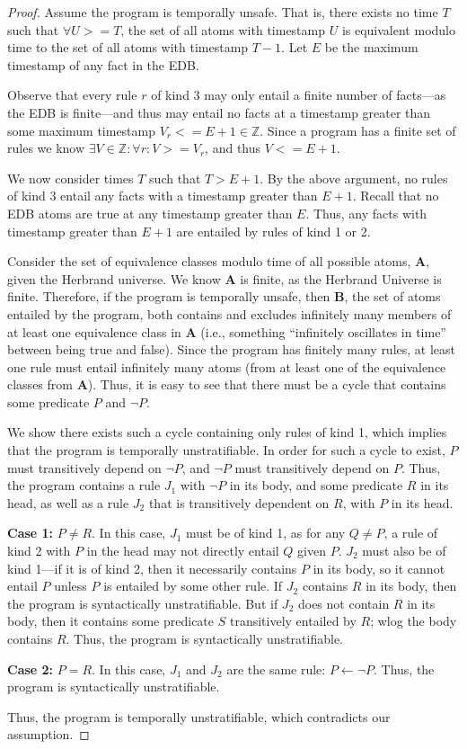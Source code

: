 \begin{proof}
%
Assume the program is temporally unsafe.  That is, there exists no time $T$
such that $\forall U >= T$, the set of all atoms with timestamp $U$ is
equivalent modulo time to the set of all atoms with timestamp $T-1$.  Let $E$
be the maximum timestamp of any fact in the EDB.

Observe that every rule $r$ of kind 3 may only entail a finite number
of facts---as the EDB is finite---and thus may entail no facts at a
timestamp greater than some maximum timestamp $V_r <= E+1 \in
\mathbb{Z}$.  Since a \slang program has a finite set of rules we know
$\exists V \in \mathbb{Z} : \forall r: V >= V_r$, and thus $V <= E+1$.

We now consider times $T$ such that $T > E+1$.  By the above argument, no rules
of kind 3 entail any facts with a timestamp greater than $E+1$.  Recall that
no EDB atoms are true at any timestamp greater than $E$.  Thus, any facts with
timestamp greater than $E+1$ are entailed by rules of kind 1 or 2.

Consider the set of equivalence classes modulo time of all possible atoms, {\bf
A}, given the Herbrand universe.  We know {\bf A} is finite, as the Herbrand
Universe is finite.  Therefore, if the program is temporally unsafe, then {\bf B}, the
set of atoms entailed by the program, both contains and excludes
infinitely many members of at least one equivalence class in {\bf A} (i.e.,
something ``infinitely oscillates in time'' between being true and false).
Since the program has finitely many rules, at least one rule must entail
infinitely many atoms (from at least one of the equivalence classes from {\bf
A}). Thus, it is easy to see that there must be a cycle that contains some predicate $P$ and $\lnot P$.

We show there exists such a cycle containing only rules of kind 1, which
implies that the program is temporally unstratifiable.  In order for such a
cycle to exist, $P$ must transitively depend on $\lnot P$, and $\lnot P$ must
transitively depend on $P$.  Thus, the program contains a rule $J_1$ with
$\lnot P$ in its body, and some predicate $R$ in its head, as well as a rule
$J_2$ that is transitively dependent on $R$, with $P$ in its head.

{\bf Case 1: }$P \neq R$.  In this case, $J_1$ must be of kind 1, as for any $Q
\neq P$, a rule of kind 2 with $P$ in the head may not directly entail $Q$
given $P$.  $J_2$ must also be of kind 1---if it is of kind 2, then it
necessarily contains $P$ in its body, so it cannot entail $P$ unless $P$ is
entailed by some other rule.  If $J_2$ contains $R$ in its body, then the
program is syntactically unstratifiable.  But if $J_2$ does not contain $R$ in
its body, then it contains some predicate $S$ transitively entailed by $R$;
wlog the body contains $R$.  Thus, the program is syntactically unstratifiable.

{\bf Case 2: }$P = R$.  In this case, $J_1$ and $J_2$ are the same rule: $P
\leftarrow \lnot P$.  Thus, the program is syntactically unstratifiable.

Thus, the program is temporally unstratifiable, which contradicts our
assumption.
%
\end{proof}
